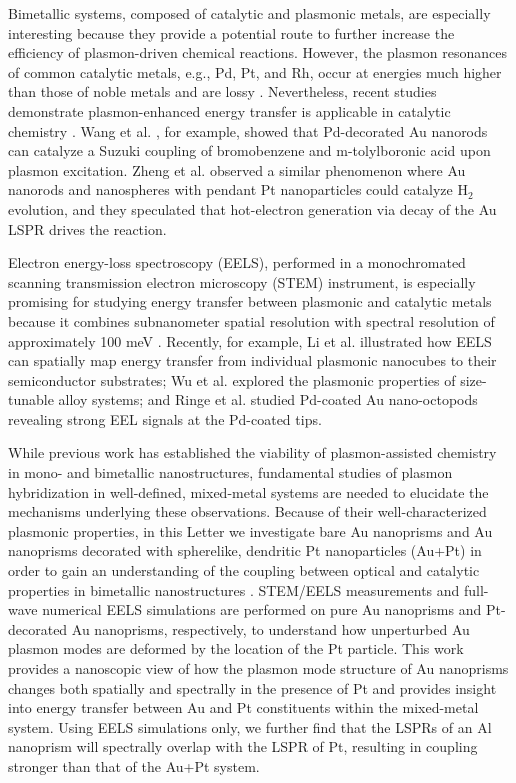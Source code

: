 \documentclass [11pt, proquest] {uwthesis}[2016/11/22]
\begin{document}
Bimetallic systems, composed of catalytic and plasmonic metals, are especially interesting because they provide a potential route to further increase the efficiency of plasmon-driven chemical reactions. However, the plasmon resonances of common catalytic metals, e.g., Pd, Pt, and Rh, occur at energies much higher than those of noble metals and are lossy \cite{Weaver}. Nevertheless, recent studies demonstrate plasmon-enhanced energy transfer is applicable in catalytic chemistry \cite{LinicCharge,LinicDominant,RingeHetero}. Wang et al. \cite{YanSuzuki}, for example, showed that Pd-decorated Au nanorods can catalyze a Suzuki coupling of bromobenzene and m-tolylboronic acid upon plasmon excitation. Zheng et al. \cite{PtAuRods} observed a similar phenomenon where Au nanorods and nanospheres with pendant Pt nanoparticles could catalyze H$_2$ evolution, and they speculated that hot-electron generation via decay of the Au LSPR drives the reaction.

Electron energy-loss spectroscopy (EELS), performed in a monochromated scanning transmission electron microscopy (STEM) instrument, is especially promising for studying energy transfer between plasmonic and catalytic metals because it combines subnanometer spatial resolution with spectral resolution of approximately 100 meV \cite{ARPC}. Recently, for example, Li et al. \cite{CubeSubstrate} illustrated how EELS can spatially map energy transfer from individual plasmonic nanocubes to their semiconductor substrates; Wu et al. \cite{Alloys} explored the plasmonic properties of size-tunable alloy systems; and Ringe et al. \cite{RingeTips} studied Pd-coated Au nano-octopods revealing strong EEL signals at the Pd-coated tips.

While previous work has established the viability of plasmon-assisted chemistry in mono- and bimetallic nanostructures, fundamental studies of plasmon hybridization in well-defined, mixed-metal systems are needed to elucidate the mechanisms underlying these observations. Because of their well-characterized plasmonic properties, in this Letter we investigate bare Au nanoprisms and Au nanoprisms decorated with spherelike, dendritic Pt nanoparticles (Au+Pt) in order to gain an understanding of the coupling between optical and catalytic properties in bimetallic nanostructures \cite{MillstoneSeedless,MillstonePtAu}. STEM/EELS measurements and full-wave numerical EELS simulations are performed on pure Au nanoprisms and Pt-decorated Au nanoprisms, respectively, to understand how unperturbed Au plasmon modes are deformed by the location of the Pt particle. This work provides a nanoscopic view of how the plasmon mode structure of Au nanoprisms changes both spatially and spectrally in the presence of Pt and provides insight into energy transfer between Au and Pt constituents within the mixed-metal system. Using EELS simulations only, we further find that the LSPRs of an Al nanoprism will spectrally overlap with the LSPR of Pt, resulting in coupling stronger than that of the Au+Pt system.
\end{document}
